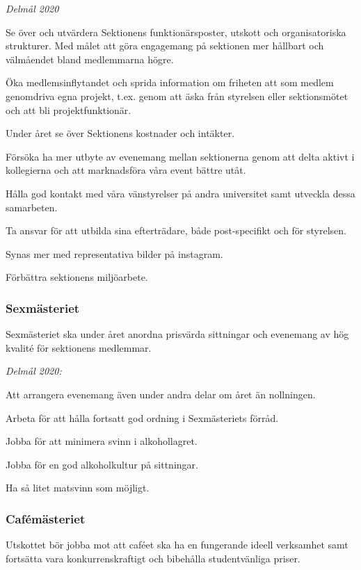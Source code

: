 \documentclass[10pt]{article}
\begin{document}
    \emph{Delmål 2020}
    \begin{dashlist}
        \item Se över och utvärdera Sektionens funktionärsposter, utskott och organisatoriska strukturer. Med målet att göra engagemang på sektionen mer hållbart och välmåendet bland medlemmarna högre. 
        \item Öka medlemsinflytandet och sprida information om friheten att som medlem genomdriva egna projekt, t.ex. genom att äska från styrelsen eller sektionsmötet och att bli projektfunktionär.   
        \item Under året se över Sektionens kostnader och intäkter. 
        \item Försöka ha mer utbyte av evenemang mellan sektionerna genom att delta aktivt i kollegierna och att marknadsföra våra event bättre utåt.
        \item Hålla god kontakt med våra vänstyrelser på andra universitet samt utveckla dessa samarbeten. 
        \item Ta ansvar för att utbilda sina efterträdare, både post-specifikt och för styrelsen.
        \item Synas mer med representativa bilder på instagram.
        \item Förbättra sektionens miljöarbete. \scalebox{0.5}{\recycle}
    \end{dashlist}
    \newpage
    \subsubsection*{Sexmästeriet}
    Sexmästeriet ska under året anordna prisvärda sittningar och evenemang av hög kvalité för sektionens medlemmar. 
    
    \emph{Delmål 2020:}
    \begin{dashlist}
        \item Att arrangera evenemang även under andra delar om året än nollningen.
        \item Arbeta för att hålla fortsatt god ordning i Sexmästeriets förråd.
        \item Jobba för att minimera svinn i alkohollagret. 
        \item Jobba för en god alkoholkultur på sittningar.
        \item Ha så litet matsvinn som möjligt. 
    \end{dashlist}
    
    \subsubsection*{Cafémästeriet}
    Utskottet bör jobba mot att caféet ska ha en fungerande ideell verksamhet samt fortsätta vara konkurrenskraftigt och bibehålla studentvänliga priser.
    
\end{document}
